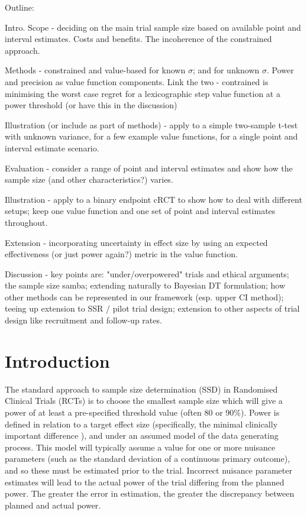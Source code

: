 \documentclass[sagev, Crown]{sagej}
\begin{document}

\maketitle

Outline:

Intro. Scope - deciding on the main trial sample size based on available point and interval estimates. Costs and benefits. The incoherence of the constrained approach.

Methods - constrained and value-based for known $\sigma$; and for unknown $\sigma$. Power and precision as value function components. Link the two - contrained is minimising the worst case regret for a lexicographic step value function at a power threshold (or have this in the discussion)

Illustration (or include as part of methods) - apply to a simple two-sample t-test with unknown variance, for a few example value functions, for a single point and interval estimate scenario.

Evaluation - consider a range of point and interval estimates and show how the sample size (and other characteristics?) varies.

Illustration - apply to a binary endpoint cRCT to show how to deal with different setups; keep one value function and one set of point and interval estimates throughout.

Extension - incorporating uncertainty in effect size by using an expected effectiveness (or just power again?) metric in the value function.

Discussion - key points are: "under/overpowered" trials and ethical arguments; the sample size samba; extending naturally to Bayesian DT formulation; how other methods can be represented in our framework (esp. upper CI method); teeing up extension to SSR / pilot trial design; extension to other aspects of trial design like recruitment and follow-up rates.


\section{Introduction}\label{sec:intro}

The standard approach to sample size determination (SSD) in Randomised Clinical Trials (RCTs) is to choose the smallest sample size which will give a power of at least a pre-specified threshold value (often 80 or 90\%). Power is defined in relation to a target effect size (specifically, the minimal clinically important difference \cite{Cook2018}), and under an assumed model of the data generating process. This model will typically assume a value for one or more nuisance parameters (such as the standard deviation of a continuous primary outcome), and so these must be estimated prior to the trial. Incorrect nuisance parameter estimates will lead to the actual power of the trial differing from the planned power. The greater the error in estimation, the greater the discrepancy between planned and actual power.
\end{document}
